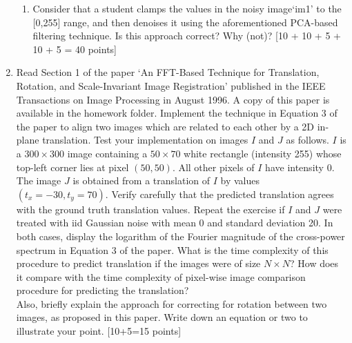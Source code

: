 \documentclass[11pt]{article}
\begin{document}
\begin{enumerate}
\begin{enumerate}
\item Consider that a student clamps the values in the noisy image`im1' to the [0,255] range, and then denoises it using the aforementioned PCA-based filtering technique. Is this approach correct? Why (not)? \textsf{[10 + 10 + 5 + 10 + 5 = 40 points]}
\end{enumerate}

\item Read Section 1 of the paper `An FFT-Based Technique for Translation, Rotation, and Scale-Invariant Image Registration' published in the IEEE Transactions on Image Processing in August 1996. A copy of this paper is available in the homework folder. Implement the technique in Equation 3 of the paper to align two images which are related to each other by a 2D in-plane translation. Test your implementation on images $I$ and $J$ as follows. $I$ is a $300 \times 300$ image containing a $50 \times 70$ white rectangle (intensity 255) whose top-left corner lies at pixel $(50,50)$. All other pixels of $I$ have intensity 0. The image $J$ is obtained from a translation of $I$ by values $(t_x=-30,t_y=70)$. Verify carefully that the predicted translation agrees with the ground truth translation values. Repeat the exercise if $I$ and $J$ were treated with iid Gaussian noise with mean 0 and standard deviation 20. In both cases, display the logarithm of the Fourier magnitude of the cross-power spectrum in Equation 3 of the paper. What is the time complexity of this procedure to predict translation if the images were of size $N \times N$? How does it compare with the time complexity of pixel-wise image comparison procedure for predicting the translation? \\
Also, briefly explain the approach for correcting for rotation between two images, as proposed in this paper. Write down an equation or two to illustrate your point. \textsf{[10+5=15 points]}

\end{enumerate}
\end{document}

